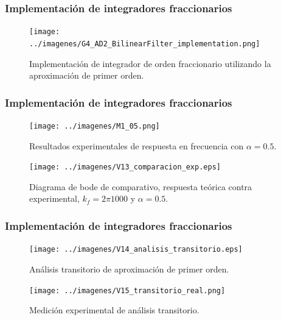 \documentclass[10pt]{beamer}
\begin{document}
	\begin{frame}
		\frametitle{Implementación de integradores fraccionarios}
		\begin{figure}[!ht] 
		\caption{Implementación de integrador de orden fraccionario utilizando la aproximación de primer orden.}
		\label{fig:G4_AD2_BilinearFilter_implementation}
		\centering
		\texttt{[image: ../imagenes/G4\_AD2\_BilinearFilter\_implementation.png]}
	\end{figure}
	\end{frame}
	\begin{frame}
		\frametitle{Implementación de integradores fraccionarios}
		\begin{minipage}[t]{0.45\textwidth}
			\begin{figure}[!ht] 
		\caption{Resultados experimentales de respuesta en frecuencia con $\alpha = 0.5$.}
		\label{fig:M1_05}
		\centering
		\texttt{[image: ../imagenes/M1\_05.png]}
	\end{figure}
		\end{minipage} \hfill \begin{minipage}[t]{0.45\textwidth}
			\begin{figure}[hbtp]
		\caption{Diagrama de bode de comparativo, respuesta teórica contra experimental,  $k_{f} = 2\pi 1000$ y  $\alpha = 0.5$.} 
		\label{fig:V13_comparacion_exp}
		\centering
		\texttt{[image: ../imagenes/V13\_comparacion\_exp.eps]}
	\end{figure}
		\end{minipage}
	\end{frame}
\begin{frame}
		\frametitle{Implementación de integradores fraccionarios}
		\begin{minipage}[t]{0.45\textwidth}
			\begin{figure}[!ht]
		\caption{Análisis transitorio de aproximación de primer orden.} 
		\label{fig:V14_analisis_transitorio}
		\centering
		\texttt{[image: ../imagenes/V14\_analisis\_transitorio.eps]}
	\end{figure}
		\end{minipage} \hfill \begin{minipage}[t]{0.45\textwidth}
			\begin{figure}[!ht]
		\caption{Medición experimental de análisis transitorio.} 
		\label{fig:V15_transitorio_real}
		\centering
		\texttt{[image: ../imagenes/V15\_transitorio\_real.png]}
	\end{figure}
		\end{minipage}
	\end{frame}
\end{document}
